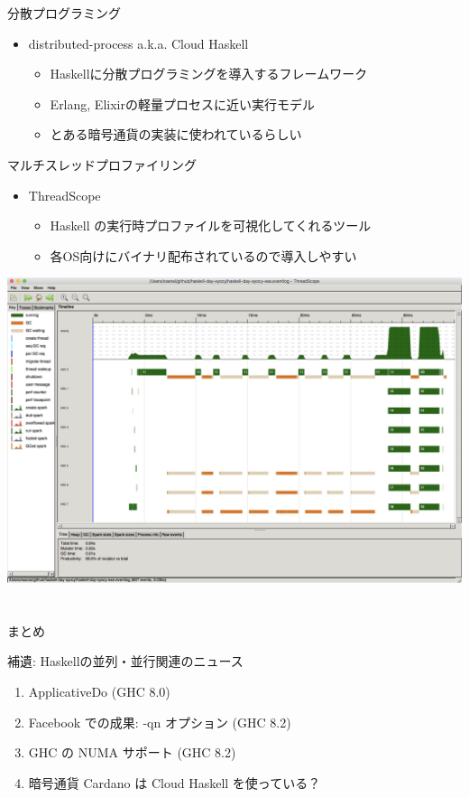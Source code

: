 \documentclass[unicode,12pt]{beamer}
\begin{document}
\begin{frame}{分散プログラミング}
  \begin{itemize}
  \item distributed-process a.k.a. Cloud Haskell
    \begin{itemize}
    \item Haskellに分散プログラミングを導入するフレームワーク
    \item Erlang, Elixirの軽量プロセスに近い実行モデル
    \item とある暗号通貨の実装に使われているらしい
    \end{itemize}
  \end{itemize}
\end{frame}

\begin{frame}{マルチスレッドプロファイリング}
  \begin{itemize}
  \item ThreadScope
    \begin{itemize}
    \item Haskell の実行時プロファイルを可視化してくれるツール
    \item 各OS向けにバイナリ配布されているので導入しやすい
    \end{itemize}
  \end{itemize}
  \centering
  \includegraphics[width=.5\textwidth]{pic/threadscope.png}
\end{frame}

\section{}

\begin{frame}{まとめ}

\end{frame}

\begin{frame}[plain]{補遺: Haskellの並列・並行関連のニュース}
  \begin{enumerate}
  \item ApplicativeDo (GHC 8.0)
  \item Facebook での成果: -qn オプション (GHC 8.2)
  \item GHC の NUMA サポート (GHC 8.2)
  \item 暗号通貨 Cardano は Cloud Haskell を使っている？
  \end{enumerate}
\end{frame}
\end{document}

